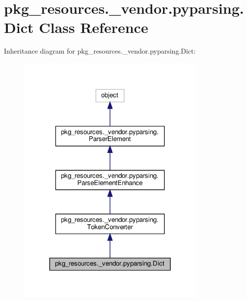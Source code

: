 \hypertarget{classpkg__resources_1_1__vendor_1_1pyparsing_1_1Dict}{}\section{pkg\+\_\+resources.\+\_\+vendor.\+pyparsing.\+Dict Class Reference}
\label{classpkg__resources_1_1__vendor_1_1pyparsing_1_1Dict}


Inheritance diagram for pkg\+\_\+resources.\+\_\+vendor.\+pyparsing.\+Dict\+:
\nopagebreak
\begin{figure}[H]
\begin{center}
\leavevmode
\includegraphics[width=264pt]{classpkg__resources_1_1__vendor_1_1pyparsing_1_1Dict__inherit__graph}
\end{center}
\end{figure}


